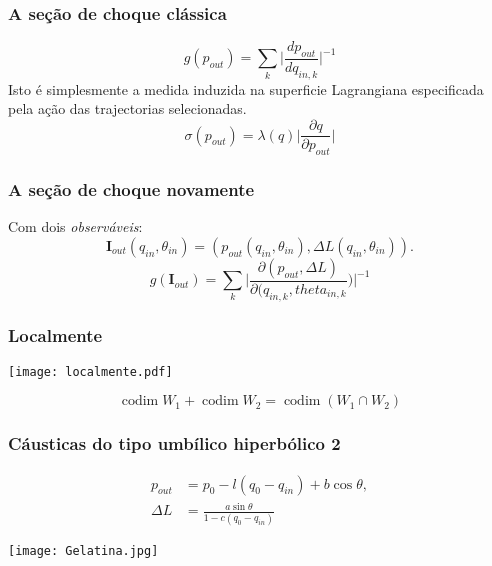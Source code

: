\documentclass{beamer}
\newcommand{\codim}{\mathop\mathrm{codim}\nolimits}
\begin{document}
\begin{frame}
  \frametitle{A seção de choque clássica}
  \begin{equation}
    g(p_{out})=
   \displaystyle\sum_k \bigg| \frac{d p_{out}}{d q_{in,k}} \bigg|^{-1}
  \end{equation}
Isto é simplesmente a medida induzida na superficie
Lagrangiana especificada pela ação das trajectorias selecionadas.
\begin{equation}
  \sigma(p_{out})=\lambda(q)\bigg|\frac{ \partial q}{\partial p_{out}}\bigg|
\end{equation}
\end{frame}


\begin{frame}
  \frametitle{A seção de choque novamente}

  Com dois \emph{observáveis}:
  \begin{equation}
    \mathbf{I}_{out}(q_{in},\theta_{in})=
      (p_{out}(q_{in},\theta_{in}),\Delta L (q_{in},\theta_{in})).
\end{equation}
 \begin{equation}
    g(\mathbf{I}_{out})=
    \displaystyle\sum_k \bigg| \frac{\partial (p_{out},\Delta L)}
                     {\partial (q_{in,k},theta_{in,k}}) \bigg|^{-1}
  \end{equation}
\end{frame}


\begin{frame}
  \frametitle{Localmente}
  \begin{center}
  \texttt{[image: localmente.pdf]}
  \end{center}

  \begin{equation}
  \codim W_1 + \codim W_2 = \codim(W_1 \cap W_2)  
  \end{equation}
\end{frame}




\begin{frame}
  \frametitle{Cáusticas do tipo umbílico hiperbólico 2}
  \begin{align}
    p_{out} &=p_0 -l(q_0-q_{in})+b \cos \theta, \\
    \Delta L &=\frac{a \sin\theta}{1-c(q_0-q_{in})}
   \end{align}
  
\begin{center}
    \texttt{[image: Gelatina.jpg]}
\end{center}
\end{frame}  
\end{document}
